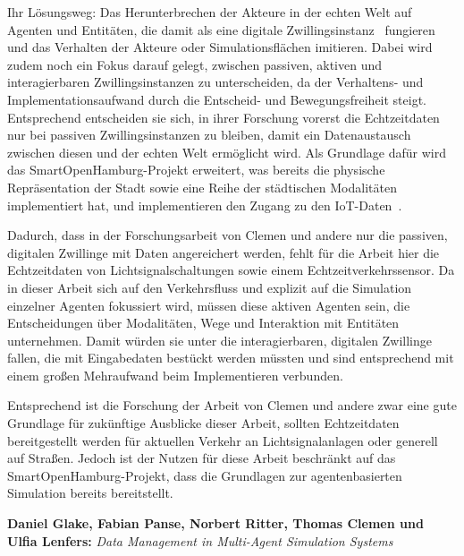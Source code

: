 Ihr Lösungsweg: Das Herunterbrechen der Akteure in der echten Welt auf Agenten und Entitäten, die damit als eine digitale Zwillingsinstanz~\cite{Clemen2021} fungieren und das Verhalten der Akteure oder Simulationsflächen imitieren.
Dabei wird zudem noch ein Fokus darauf gelegt, zwischen passiven, aktiven und interagierbaren Zwillingsinstanzen zu unterscheiden, da der Verhaltens- und Implementationsaufwand durch die Entscheid- und Bewegungsfreiheit steigt.
Entsprechend entscheiden sie sich, in ihrer Forschung vorerst die Echtzeitdaten nur bei passiven Zwillingsinstanzen zu bleiben, damit ein Datenaustausch zwischen diesen und der echten Welt ermöglicht wird.
Als Grundlage dafür wird das SmartOpenHamburg-Projekt erweitert, was bereits die physische Repräsentation der Stadt sowie eine Reihe der städtischen Modalitäten implementiert hat, und implementieren den Zugang zu den IoT-Daten~\cite{Clemen2021}.

Dadurch, dass in der Forschungsarbeit von Clemen und andere nur die passiven, digitalen Zwillinge mit Daten angereichert werden, fehlt für die Arbeit hier die Echtzeitdaten von Lichtsignalschaltungen sowie einem Echtzeitverkehrssensor.
Da in dieser Arbeit sich auf den Verkehrsfluss und explizit auf die Simulation einzelner Agenten fokussiert wird, müssen diese aktiven Agenten sein, die Entscheidungen über Modalitäten, Wege und Interaktion mit Entitäten unternehmen.
Damit würden sie unter die interagierbaren, digitalen Zwillinge fallen, die mit Eingabedaten bestückt werden müssten und sind entsprechend mit einem großen Mehraufwand beim Implementieren verbunden.

Entsprechend ist die Forschung der Arbeit von Clemen und andere zwar eine gute Grundlage für zukünftige Ausblicke dieser Arbeit, sollten Echtzeitdaten bereitgestellt werden für aktuellen Verkehr an Lichtsignalanlagen oder generell auf Straßen.
Jedoch ist der Nutzen für diese Arbeit beschränkt auf das SmartOpenHamburg-Projekt, dass die Grundlagen zur agentenbasierten Simulation bereits bereitstellt.


\textbf{Daniel Glake, Fabian Panse, Norbert Ritter, Thomas Clemen und Ulfia Lenfers:}
\textit{Data Management in Multi-Agent Simulation Systems}

